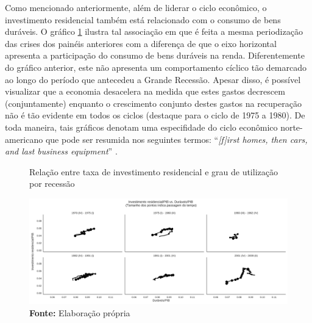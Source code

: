 
Como mencionado anteriormente, além de liderar o ciclo econômico, o investimento residencial também está relacionado com o consumo de bens duráveis.
O gráfico \ref{FigInvesto_Duraveis} ilustra tal associação em que é feita a mesma periodização das crises dos painéis anteriores com a diferença de que o eixo horizontal apresenta a participação do consumo de bens duráveis na renda. 
Diferentemente do gráfico anterior, este não apresenta um comportamento cíclico tão demarcado ao longo do período que antecedeu a Grande Recessão. Apesar disso, é possível visualizar que a economia desacelera na medida que estes gastos decrescem (conjuntamente) enquanto o crescimento conjunto destes gastos na recuperação não é tão evidente em todos os ciclos (destaque para o ciclo de 1975 a 1980).
De toda maneira, tais gráficos denotam uma especifidade do ciclo econômico norte-americano que pode ser resumida nos seguintes termos: ``\textit{[f]irst homes, then cars, and last business equipment}'' \cite[p.~8]{leamer_housing_2007}.

\begin{figure}[H]
	\centering
	\caption{Relação entre taxa de investimento residencial e grau de utilização por recessão}
	\label{FigInvesto_Duraveis}
	\includegraphics[width=\textwidth]{../../Dados/Fatos_Estilizados/figs/Ciclo_Ih_Duraveis.png}
	\caption*{\textbf{Fonte:} Elaboração própria}
\end{figure}

